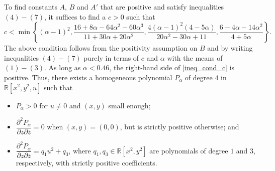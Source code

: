 \documentclass[10pt]{amsart}
\numberwithin{equation}{section}
\theoremstyle{definition}
\theoremstyle{definition}
\theoremstyle{plain}
\newcommand{\be} {\begin{equation}}
\newcommand{\ee} {\end{equation}}
\newcommand{\zbar}{\overline{z}}
\newcommand\secpartl[3]{\dfrac{\partial^2{#1}}{\partial{#2}\partial{#3}}}
\newcommand{\rl}{\mathbb{R}}
\begin{document}
To find constants $A$, $B$ and $A'$ that are positive and satisfy inequalities $(4)-(7)$, it suffices to find a $c>0$ such that 
	\be\label{ineq_cond_c}
	c<\min\left\{(\alpha-1)^2,
				\frac{16+8\alpha-64\alpha^2-60\alpha^3}{11+30\alpha+20\alpha^2},
				 \frac{4(\alpha-1)^2(4-5\alpha)}{20\alpha^2-30\alpha+11},	
				  \frac{6-4\alpha-14\alpha^2}{4+5\alpha}
						\right\}.
	\ee
The above condition follows from the positivity assumption on $B$ and by writing inequalities $(4)-(7)$ purely in terms of $c$ and $\alpha$ with the means of $(1)-(3)$. As long as $\alpha<0.46$, the right-hand side of \eqref{ineq_cond_c} is positive. Thus, there exists a homogeneous polynomial $P_\alpha$ of degree $4$ in $\rl[x^2,y^2,u]$ such that 
	\begin{itemize}		
		\item $P_\alpha>0$ for $u\neq 0$ and $(x,y)$ small enough;
\vspace{0.5em} 
		\item $\secpartl{P_\alpha}{z}{\zbar}=0$ when $(x,y)=(0,0)$, but is strictly positive otherwise; and	
\vspace{0.5em} 
		\item $\secpartl{P_\alpha}{z}{\zbar}=q_1u^2+q_3$, where $q_1, q_3\in\rl[x^2,y^2]$ are polynomials of degree $1$ and $3$, respectively, with strictly positive coefficients. 
	\end{itemize}
\end{document}
